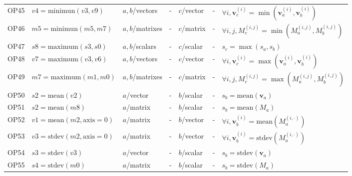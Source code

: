 \documentclass[11pt,oneside,openany,report]{jsbook}
\begin{document}
\begin{center}
{{\begin{longtable}{l|l|lc|lc|l}
        OP45 & $v4 = \mathrm{minimun}(v3, v9)$            & $a,b$/vectors           & -               & $c$/vector & -     & $\forall i,\bm{v}_c^{(i)} = \min{\left(\bm{v}_a^{(i)},\bm{v}_b^{(i)}\right)}$  \\
        OP46 & $m5 = \mathrm{minimun}(m5, m7)$            & $a,b$/matrixes          & -               & $c$/matrix & -     & $\forall i,j,M_c^{(i,j)} = \min{\left(M_a^{(i,j)}, M_b^{(i,j)}\right)}$        \\
        OP47 & $s8 = \mathrm{maximum}(s3, s0)$            & $a,b$/scalars           & -               & $c$/scalar & -     & $s_c = \max{(s_a,s_b)}$                                                        \\
        OP48 & $v7 = \mathrm{maximum}(v3, v6)$            & $a,b$/vectors           & -               & $c$/vector & -     & $\forall i, \bm{v}_c^{(i)} = \max{\left(\bm{v}_a^{(i)},\bm{v}_b^{(i)}\right)}$ \\
        OP49 & $m7 = \mathrm{maximum}(m1, m0)$            & $a,b$/matrixes          & -               & $c$/matrix & -     & $\forall i,j, M_c^{(i,j)} = \max{\left(M_a^{(i,j)}, M_b^{(i,j)}\right)}$       \\
        OP50 & $s2 = \mathrm{mean}(v2)$                   & $a$/vector              & -               & $b$/scalar & -     & $s_b = \mathrm{mean}\left(\bm{v}_a\right)$                                     \\
        OP51 & $s2 = \mathrm{mean}(m8)$                   & $a$/matrix              & -               & $b$/scalar & -     & $s_b = \mathrm{mean}\left(M_a\right)$                                          \\
        OP52 & $v1 = \mathrm{mean}(m2, \mathrm{axis}=0)$  & $a$/matrix              & -               & $b$/vector & -     & $\forall i,\bm{v}_b^{(i)} = \mathrm{mean}\left(M_a^{(i,\cdot)}\right)$         \\
        OP53 & $v3 = \mathrm{stdev}(m2, \mathrm{axis}=0)$ & $a$/matrix              & -               & $b$/vector & -     & $\forall i,\bm{v}_b^{(i)} = \mathrm{stdev}\left(M_a^{(i,\cdot)}\right)$        \\
        OP54 & $s3 = \mathrm{stdev}(v3)$                  & $a$/vector              & -               & $b$/scalar & -     & $s_b = \mathrm{stdev}\left(\bm{v}_a\right)$                                    \\
        OP55 & $s4 = \mathrm{stdev}(m0)$                  & $a$/matrix              & -               & $b$/scalar & -     & $s_b = \mathrm{stdev}\left(M_a\right)$                                         \\

\end{longtable}}}
\end{center}
\end{document}
